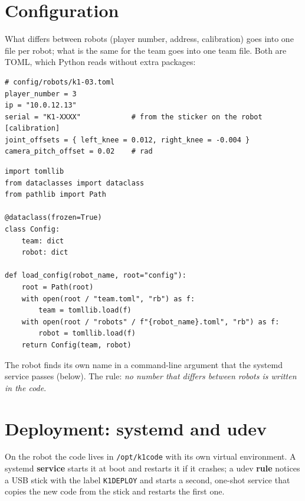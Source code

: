 \section*{Configuration}
What differs between robots (player number, address, calibration) goes into one file per robot; what is the same for the team goes into one team file. Both are TOML, which Python reads without extra packages:
\begin{verbatim}
# config/robots/k1-03.toml
player_number = 3
ip = "10.0.12.13"
serial = "K1-XXXX"            # from the sticker on the robot
[calibration]
joint_offsets = { left_knee = 0.012, right_knee = -0.004 }
camera_pitch_offset = 0.02    # rad
\end{verbatim}
\begin{verbatim}
import tomllib
from dataclasses import dataclass
from pathlib import Path

@dataclass(frozen=True)
class Config:
    team: dict
    robot: dict

def load_config(robot_name, root="config"):
    root = Path(root)
    with open(root / "team.toml", "rb") as f:
        team = tomllib.load(f)
    with open(root / "robots" / f"{robot_name}.toml", "rb") as f:
        robot = tomllib.load(f)
    return Config(team, robot)
\end{verbatim}
The robot finds its own name in a command-line argument that the systemd service passes (below). The rule: \emph{no number that differs between robots is written in the code}.

\section*{Deployment: systemd and udev}
On the robot the code lives in \texttt{/opt/k1code} with its own virtual environment. A systemd \textbf{service} starts it at boot and restarts it if it crashes; a udev \textbf{rule} notices a USB stick with the label \texttt{K1DEPLOY} and starts a second, one-shot service that copies the new code from the stick and restarts the first one.
\begin{center}
\end{center}

